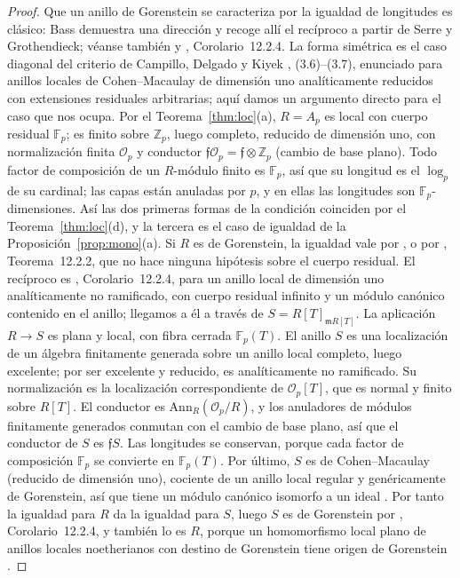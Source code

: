 \documentclass[11pt,a4paper]{article}
\theoremstyle{definition}
\newcommand{\ZZ}{\mathbb{Z}}
\newcommand{\FF}{\mathbb{F}}
\newcommand{\cO}{\mathcal{O}}
\newcommand{\cf}{\mathfrak{f}}
\begin{document}
\begin{proof}
Que un anillo de Gorenstein se caracteriza por la igualdad de longitudes es clásico: Bass demuestra una dirección
\cite[Cor.~(6.5)]{Bas63} y recoge allí el recíproco a partir de Serre y Grothendieck; véanse también \cite{HK71} y
\cite{HS06}, Corolario~12.2.4. La forma simétrica es el caso diagonal del criterio de Campillo, Delgado y
Kiyek \cite{CDK94}, (3.6)--(3.7), enunciado para anillos locales de Cohen--Macaulay de dimensión uno analíticamente
reducidos con extensiones residuales arbitrarias; aquí damos un argumento directo para el caso que nos ocupa. Por el
Teorema~\ref{thm:loc}(a), $R=A_p$ es local con cuerpo residual $\FF_p$; es finito sobre $\ZZ_p$, luego completo,
reducido de dimensión uno, con normalización finita $\cO_p$ y conductor $\cf\cO_p=\cf\otimes\ZZ_p$ (cambio de base
plano). Todo factor de composición de un $R$-módulo finito es $\FF_p$, así que su longitud es el $\log_p$ de su
cardinal; las capas están anuladas por $p$, y en ellas las longitudes son $\FF_p$-dimensiones. Así las dos primeras
formas de la condición coinciden por el Teorema~\ref{thm:loc}(d), y la tercera es el caso de igualdad de la
Proposición~\ref{prop:mono}(a). Si $R$ es de Gorenstein, la igualdad vale por
\cite[Cor.~(6.5)]{Bas63}, o por \cite{HS06}, Teorema~12.2.2, que no hace ninguna hipótesis sobre el cuerpo residual. El
recíproco es \cite{HS06}, Corolario~12.2.4, para un anillo local de dimensión uno analíticamente no ramificado, con
cuerpo residual infinito y un módulo canónico contenido en el anillo; llegamos a él a través de $S=R[T]_{\mathfrak mR[T]}$.
La aplicación $R\to S$ es plana y local, con fibra cerrada $\FF_p(T)$. El anillo $S$ es una localización de un álgebra
finitamente generada sobre un anillo local completo, luego excelente; por ser excelente y reducido, es analíticamente
no ramificado. Su normalización es la localización correspondiente de $\cO_p[T]$, que es normal y finito sobre $R[T]$.
El conductor es $\mathrm{Ann}_R(\cO_p/R)$, y los anuladores de módulos finitamente generados conmutan con el cambio de
base plano, así que el conductor de $S$ es $\cf S$. Las longitudes se conservan, porque cada factor de composición
$\FF_p$ se convierte en $\FF_p(T)$. Por último, $S$ es de Cohen--Macaulay (reducido de dimensión uno), cociente de un
anillo local regular y genéricamente de Gorenstein, así que tiene un módulo canónico
isomorfo a un ideal \cite[Teor.~3.3.6, Prop.~3.3.18(b)]{BH98}. Por tanto la igualdad para $R$ da la igualdad para $S$, luego $S$ es de
Gorenstein por \cite{HS06}, Corolario~12.2.4, y también lo es $R$, porque un homomorfismo local plano de anillos
locales noetherianos con destino de Gorenstein tiene origen de Gorenstein \cite[Tag~0BJL]{Stacks}.
\end{proof}
\end{document}
